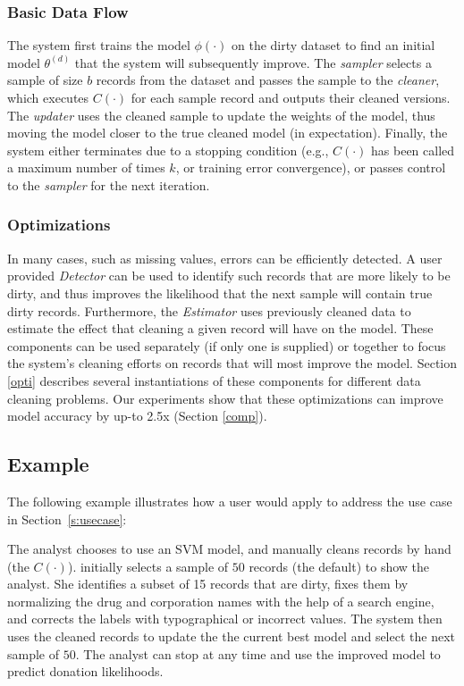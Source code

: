 \subsubsection{Basic Data Flow} \label{df}
The system first trains the model $\phi(\cdot)$ on the dirty dataset to find an initial model $\theta^{(d)}$ that the system will subsequently improve.
The {\it sampler} selects a sample of size $b$ records from the dataset and passes
the sample to the {\it cleaner}, which executes $C(\cdot)$ for each sample record and outputs their cleaned versions.
The \emph{updater} uses the cleaned sample to update the weights of the model, thus moving the model closer to the true cleaned model (in expectation).
Finally, the system either terminates due to a stopping condition (e.g., $C(\cdot)$ has been called a maximum number of times $k$, or training error convergence),
or passes control to the {\it sampler} for the next iteration.

\subsubsection{Optimizations}
In many cases, such as missing values, errors can be efficiently detected.
A user provided {\it Detector} can be used to identify such records that are more likely to be dirty, and thus improves the likelihood that the next sample will contain true dirty records.
Furthermore, the {\it Estimator} uses previously cleaned data to estimate the effect that cleaning a given record will have on the model.
These components can be used separately (if only one is supplied) or together to focus the system's cleaning efforts on records that will most improve the model.
Section \ref{opti} describes several instantiations of these components for different data cleaning problems.
Our experiments show that these optimizations can improve model accuracy by up-to 2.5x (Section \ref{comp}).

\subsection{Example}
The following example illustrates how a user would apply \sys to address the use case in Section~\ref{s:usecase}:
\begin{example}\label{archex}
The analyst chooses to use an SVM model, and manually cleans records by hand (the $C(\cdot)$).  
\sys initially selects a sample of $50$ records (the default)  to show the analyst.
She identifies a subset of 15 records that are dirty, fixes them by normalizing the drug and corporation names with the help of a search engine, and corrects the labels with typographical or incorrect values.
The system then uses the cleaned records to update the the current best model and select the next sample of $50$.
The analyst can stop at any time and use the improved model to predict donation likelihoods.
\end{example}






